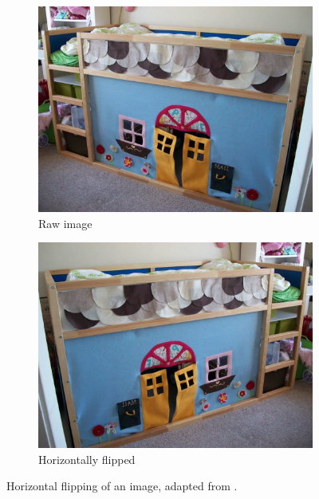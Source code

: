 \documentclass[10pt,twocolumn,letterpaper]{article}
\begin{document}
\begin{figure}[!htbp]
  \centering
  \begin{subfigure}[b]{0.4\columnwidth}
    \centering
    \includegraphics[width=\linewidth]{Figures/FlipRaw.jpg}
    \caption{Raw image}
    \label{fig:short-a}
  \end{subfigure}
\hspace{0.01\textwidth}
  \begin{subfigure}[b]{0.4\columnwidth}
\centering
    \includegraphics[width=\linewidth]{Figures/FlipHoriz.jpg}
    \caption{Horizontally flipped}
    \label{fig:short-b}
  \end{subfigure}
  \caption{Horizontal flipping of an image, adapted from \cite{OfficeHome}.}
  \label{fig:horiz}
\end{figure}
\end{document}
